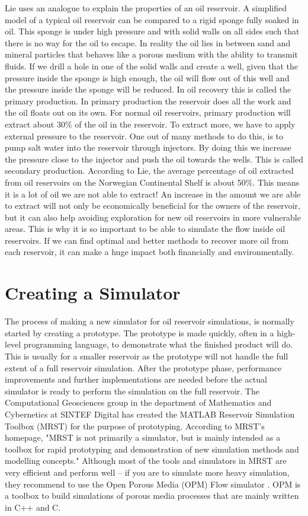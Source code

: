 Lie uses an analogue to explain the properties of an oil reservoir. A simplified model of a typical oil reservoir can be compared to a rigid sponge fully soaked in oil. This sponge is under high pressure and with solid walls on all sides such that there is no way for the oil to escape. In reality the oil lies in between sand and mineral particles that behaves like a porous medium with the ability to transmit fluids. If we drill a hole in one of the solid walls and create a well, given that the pressure inside the sponge is high enough, the oil will flow out of this well and the pressure inside the sponge will be reduced. In oil recovery this is called the primary production. In primary production the reservoir does all the work and the oil floats out on its own. For normal oil reservoirs, primary production will extract about 30\% of the oil in the reservoir. To extract more, we have to apply external pressure to the reservoir. One out of many methods to do this, is to pump salt water into the reservoir through injectors. By doing this we increase the pressure close to the injector and push the oil towards the wells. This is called secondary production. According to Lie, the average percentage of oil extracted from oil reservoirs on the Norwegian Continental Shelf is about 50\%. This means it is a lot of oil we are not able to extract! An increase in the amount we are able to extract will not only be economically beneficial for the owners of the reservoir, but it can also help avoiding exploration for new oil reservoirs in more vulnerable areas. This is why it is so important to be able to simulate the flow inside oil reservoirs. If we can find optimal and better methods to recover more oil from each reservoir, it can make a huge impact both financially and environmentally.

\section{Creating a Simulator}
The process of making a new simulator for oil reservoir simulations, is normally started by creating a prototype. The prototype is made quickly, often in a high-level programming language, to demonstrate what the finished product will do. This is usually for a smaller reservoir as the prototype will not handle the full extent of a full reservoir simulation. After the prototype phase, performance improvements and further implementations are needed before the actual simulator is ready to perform the simulation on the full reservoir. The Computational Geosciences group in the department of Mathematics and Cybernetics at SINTEF Digital has created the MATLAB Reservoir Simulation Toolbox (MRST) \emph{\citep{mrstHomepage}} for the  purpose of prototyping. According to MRST's homepage, "MRST is not primarily a simulator, but is mainly intended as a toolbox for rapid prototyping and demonstration of new simulation methods and modelling concepts." Although most of the tools and simulators in MRST are very efficient and perform well -- if you are to simulate more heavy simulation, they recommend to use the Open Porous Media (OPM) Flow simulator \emph{\citep{OPM}}. OPM is a toolbox to build simulations of porous media processes that are mainly written in C++ and C. 

